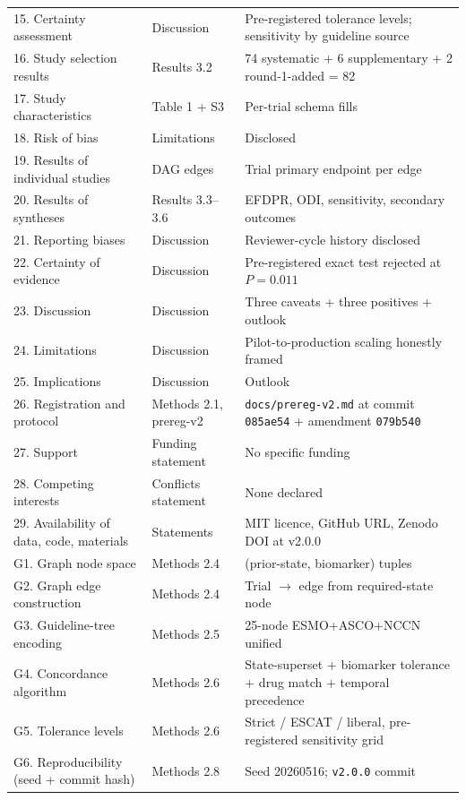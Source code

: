 \documentclass[11pt,a4paper]{article}
\begin{document}
\begin{longtable}{p{5.6cm}p{3.0cm}p{6.0cm}}
15. Certainty assessment & Discussion & Pre-registered tolerance levels; sensitivity by guideline source \\
16. Study selection results & Results 3.2 & 74 systematic + 6 supplementary + 2 round-1-added = 82 \\
17. Study characteristics & Table 1 + S3 & Per-trial schema fills \\
18. Risk of bias & Limitations & Disclosed \\
19. Results of individual studies & DAG edges & Trial primary endpoint per edge \\
20. Results of syntheses & Results 3.3--3.6 & EFDPR, ODI, sensitivity, secondary outcomes \\
21. Reporting biases & Discussion & Reviewer-cycle history disclosed \\
22. Certainty of evidence & Discussion & Pre-registered exact test rejected at $P = 0.011$ \\
23. Discussion & Discussion & Three caveats + three positives + outlook \\
24. Limitations & Discussion & Pilot-to-production scaling honestly framed \\
25. Implications & Discussion & Outlook \\
26. Registration and protocol & Methods 2.1, prereg-v2 & \texttt{docs/prereg-v2.md} at commit \texttt{085ae54} + amendment \texttt{079b540} \\
27. Support & Funding statement & No specific funding \\
28. Competing interests & Conflicts statement & None declared \\
29. Availability of data, code, materials & Statements & MIT licence, GitHub URL, Zenodo DOI at v2.0.0 \\
\midrule
G1. Graph node space & Methods 2.4 & (prior-state, biomarker) tuples \\
G2. Graph edge construction & Methods 2.4 & Trial $\to$ edge from required-state node \\
G3. Guideline-tree encoding & Methods 2.5 & 25-node ESMO+ASCO+NCCN unified \\
G4. Concordance algorithm & Methods 2.6 & State-superset + biomarker tolerance + drug match + temporal precedence \\
G5. Tolerance levels & Methods 2.6 & Strict / ESCAT / liberal, pre-registered sensitivity grid \\
G6. Reproducibility (seed + commit hash) & Methods 2.8 & Seed 20260516; \texttt{v2.0.0} commit \\
\bottomrule
\end{longtable}
\end{document}
